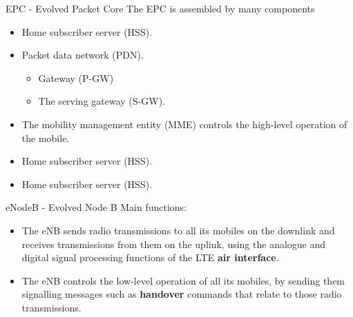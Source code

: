 \documentclass{beamer}
\begin{document}
\begin{frame}{EPC - Evolved Packet Core}
The EPC is assembled by many components
\begin{itemize}
    \item Home subscriber server (HSS).
    \pause
    \item Packet data network (PDN).
        \begin{itemize}
            \item Gateway (P-GW)
            \item The serving gateway (S-GW).
        \end{itemize}
    \pause
    \item The mobility management entity (MME) controls the high-level operation of the mobile.
    \pause
    \item Home subscriber server (HSS).
    \pause
    \item Home subscriber server (HSS).
\end{itemize}
\end{frame}
\begin{frame}{eNodeB - Evolved Node B}
Main functions:
\begin{itemize}
    \item The eNB sends radio transmissions to all its mobiles on the downlink and receives transmissions from them on the uplink, using the analogue and digital signal processing functions of the LTE \textbf{air interface}.
    \pause %
    \item The eNB controls the low-level operation of all its mobiles, by sending them signalling messages such as \textbf{handover} commands that relate to those radio transmissions.
\end{itemize}
\end{frame}

\end{document}
